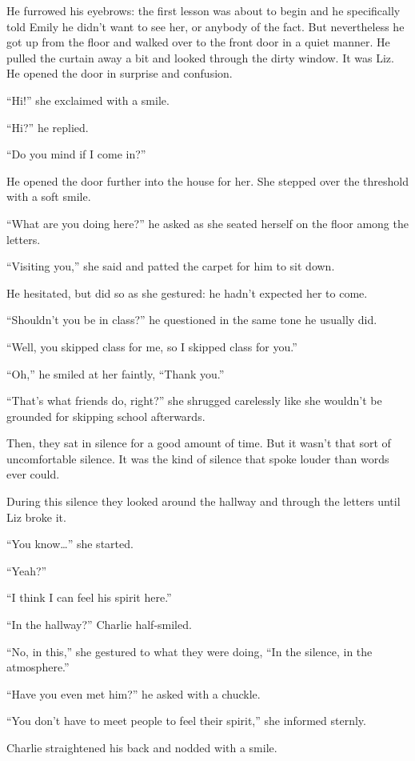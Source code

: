He furrowed his eyebrows: the first lesson was about to begin and he specifically told Emily he didn’t want to see her, or anybody of the fact. But nevertheless he got up from the floor and walked over to the front door in a quiet manner. He pulled the curtain away a bit and looked through the dirty window. It was Liz. He opened the door in surprise and confusion.

“Hi!” she exclaimed with a smile.

“Hi?” he replied.

“Do you mind if I come in?”

He opened the door further into the house for her. She stepped over the threshold with a soft smile.

“What are you doing here?” he asked as she seated herself on the floor among the letters.

“Visiting you,” she said and patted the carpet for him to sit down.

He hesitated, but did so as she gestured: he hadn’t expected her to come.

“Shouldn’t you be in class?” he questioned in the same tone he usually did.

“Well, you skipped class for me, so I skipped class for you.”

“Oh,” he smiled at her faintly, “Thank you.”

“That’s what friends do, right?” she shrugged carelessly like she wouldn’t be grounded for skipping school afterwards.

Then, they sat in silence for a good amount of time. But it wasn’t that sort of uncomfortable silence. It was the kind of silence that spoke louder than words ever could.

During this silence they looked around the hallway and through the letters until Liz broke it.

“You know…” she started.

“Yeah?”

“I think I can feel his spirit here.”

“In the hallway?” Charlie half-smiled.

“No, in this,” she gestured to what they were doing, “In the silence, in the atmosphere.”

“Have you even met him?” he asked with a chuckle.

“You don’t have to meet people to feel their spirit,” she informed sternly.

Charlie straightened his back and nodded with a smile.

